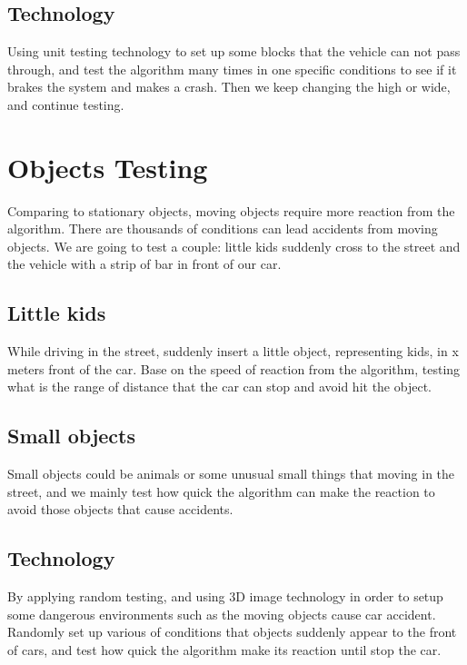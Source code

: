 \documentclass[10pt,draftclsnofoot,onecolumn,journal,compsoc]{IEEEtran}
\begin{document}
\subsection{Technology}
Using unit testing technology to set up some blocks that the vehicle can not pass through, and test the algorithm many times in one specific conditions to see if it brakes the system and makes a crash. Then we keep changing the high or wide, and continue testing.


\section{Objects Testing}
Comparing to stationary objects, moving objects require more reaction from the algorithm. There are thousands of conditions can lead accidents from moving objects. We are going to test a couple: little kids suddenly cross to the street and the vehicle with a strip of bar in front of our car.   
\subsection{Little kids}
While driving in the street, suddenly insert a little object, representing kids, in x meters front of the car. Base on the speed of reaction from the algorithm, testing what is the range of distance that the car can stop and avoid hit the object.

\subsection{Small objects}
Small objects could be animals or some unusual small things that moving in the street, and we mainly test how quick the algorithm can make the reaction to avoid those objects that cause accidents.

\subsection{Technology}
By applying random testing, and using 3D image technology in order to setup some dangerous environments such as the moving objects cause car accident. Randomly set up various of conditions that objects suddenly appear to the front of cars, and test how quick the algorithm make its reaction until stop the car.
\end{document}
